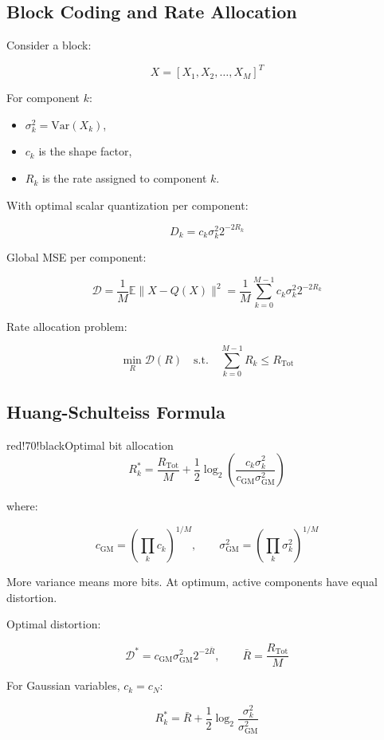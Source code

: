 \subsection{Block Coding and Rate Allocation}

Consider a block:

\[
X=[X_1,X_2,\ldots,X_M]^T
\]

For component $k$:

\begin{itemize}
  \item $\sigma_k^2=\mathrm{Var}(X_k)$,
  \item $c_k$ is the shape factor,
  \item $R_k$ is the rate assigned to component $k$.
\end{itemize}

With optimal scalar quantization per component:

\[
D_k=c_k\sigma_k^2 2^{-2R_k}
\]

Global MSE per component:

\[
\mathcal{D}
=\frac{1}{M}\mathbb{E}\|X-Q(X)\|^2
=\frac{1}{M}\sum_{k=0}^{M-1}c_k\sigma_k^2 2^{-2R_k}
\]

Rate allocation problem:

\[
\min_R \mathcal{D}(R)
\quad\text{s.t.}\quad
\sum_{k=0}^{M-1}R_k\leq R_{\text{Tot}}
\]

\subsection{Huang-Schulteiss Formula}

\begin{calloutbox}{red!70!black}{Optimal bit allocation}
\[
R_k^*
=
\frac{R_{\text{Tot}}}{M}
+
\frac{1}{2}\log_2
\left(
\frac{c_k\sigma_k^2}
{c_{\text{GM}}\sigma_{\text{GM}}^2}
\right)
\]

where:

\[
c_{\text{GM}}=\left(\prod_k c_k\right)^{1/M},
\qquad
\sigma_{\text{GM}}^2=\left(\prod_k\sigma_k^2\right)^{1/M}
\]

More variance means more bits. At optimum, active components have equal distortion.
\end{calloutbox}

Optimal distortion:

\[
\mathcal{D}^*
=c_{\text{GM}}\sigma_{\text{GM}}^2 2^{-2\bar{R}},
\qquad
\bar{R}=\frac{R_{\text{Tot}}}{M}
\]

For Gaussian variables, $c_k=c_N$:

\[
R_k^*=\bar{R}+\frac{1}{2}\log_2\frac{\sigma_k^2}{\sigma_{\text{GM}}^2}
\]


